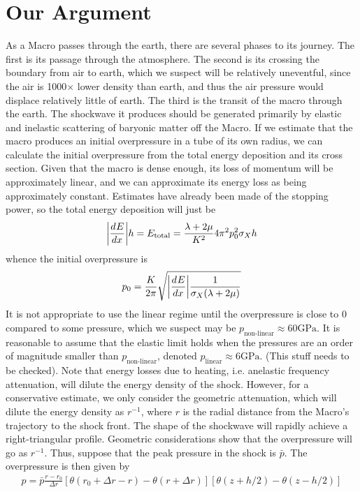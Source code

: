 \documentclass{article}
\newcommand*\te[1]{\text{#1}}
\newcommand*\ps[1]{\left[#1\right]}
\newcommand*\f[2]{\frac{#1}{#2}}
\newcommand*\td[3]{\frac{d^{#3}#1}{d #2^{#3}}}
\begin{document}
\section{Our Argument}
As a Macro passes through the earth, there are several phases to its journey. The first is its passage through the atmosphere. The second is its crossing the boundary from air to earth, which we suspect will be relatively uneventful, since the air is 1000$\times$ lower density than earth, and thus the air pressure would displace relatively little of earth. The third is the transit of the macro through the earth. The shockwave it produces should be generated primarily by elastic and inelastic scattering of baryonic matter off the Macro. If we estimate that the macro produces an initial overpressure in a tube of its own radius, we can calculate the initial overpressure from the total energy deposition and its cross section. Given that the macro is dense enough, its loss of momentum will be approximately linear, and we can approximate its energy loss as being approximately constant. Estimates have already been made of the stopping power, so the total energy deposition will just be
\begin{align}
\abs{\td{E}{x}{}}h=E_{\te{total}}=\f{\lambda+2\mu}{K^2}4\pi^2p_0^2\sigma_Xh
\end{align}
whence the initial overpressure is
\begin{align}
p_0=\f{K}{2\pi}\sqrt{\abs{\td{E}{x}{}}\f{1}{\sigma_X(\lambda+2\mu)}}
\end{align}
It is not appropriate to use the linear regime until the overpressure is close to 0 compared to some pressure, which we suspect may be $p_{\te{non-linear}}\approx60\te{GPa}$. It is reasonable to assume that the elastic limit holds when the pressures are an order of magnitude smaller than $p_{\te{non-linear}}$, denoted $p_{\te{linear}}\approx6\te{GPa}$. (This stuff needs to be checked). Note that energy losses due to heating, i.e. anelastic frequency attenuation, will dilute the energy density of the shock. However, for a conservative  estimate, we only consider the geometric attenuation, which will dilute the energy density as $r^{-1}$, where $r$ is the radial distance from the Macro's trajectory to the shock front. The shape of the shockwave will rapidly achieve a right-triangular profile. Geometric considerations show that the overpressure will go as $r^{-1}$. Thus, suppose that the peak pressure in the shock is $\bar p$. The overpressure is then given by
\begin{align}
p=\bar p\f{r-r_0}{\Delta r}\ps{\theta(r_0+\Delta r-r)-\theta(r+\Delta r)}\ps{\theta(z+h/2)-\theta(z-h/2)}
\end{align}
\end{document}
